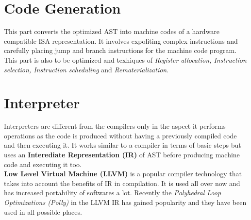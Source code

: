 \section{Code Generation}
This part converts the optimized AST into machine codes of a hardware compatible ISA representation. It involves expoliting complex instructions and carefully placing jump and branch instructions for the machine code program. This part is also to be optimized and texhiques of \textit{Register allocation, Instruction selection, Instruction scheduling} and \textit{Rematerialization}. 

\section{Interpreter}
Interpreters are different from the compilers only in the aspect it performs operations as the code is produced without having a previously compiled code and then executing it. It works similar to a compiler in terms of basic steps but uses an \textbf{Interediate Representation (IR)} of AST before producing machine code and executing it too.\\

\textbf{Low Level Virtual Machine (LLVM)} is a popular compiler technology that takes into account the benefits of IR in compilation. It is used all over now and has increased portability of softwares a lot. Recently the \textit{Polyhedral Loop Optimizations (Polly)} in the LLVM IR has gained popularity and they have been used in all possible places.\\

